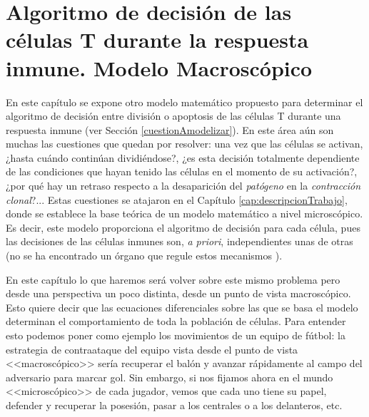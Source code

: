 
\chapter{Algoritmo de decisión de las células T durante la respuesta inmune. Modelo Macroscópico}
\label{cap:modeloMacroscopico}

En este capítulo se expone otro modelo matemático propuesto para determinar el algoritmo de decisión entre división o apoptosis de las células T durante una respuesta inmune (ver Sección \ref{cuestionAmodelizar}). En este área aún son muchas las cuestiones que quedan por resolver: una vez que las células se activan, ¿hasta cuándo continúan dividiéndose?, ¿es esta decisión totalmente dependiente de las condiciones que hayan tenido las células en el momento de su activación?, ¿por qué hay un retraso respecto a la desaparición del \textit{patógeno} en la \textit{contracción clonal}?... Estas cuestiones se atajaron en el Capítulo \ref{cap:descripcionTrabajo}, donde se establece la base teórica de un modelo matemático a nivel microscópico. Es decir, este modelo proporciona el algoritmo de decisión para cada célula, pues las decisiones de las células inmunes son, \textit{a priori}, independientes unas de otras (no se ha encontrado un órgano que regule estos mecanismos \citep{arias2016emergent}).

En este capítulo lo que haremos será volver sobre este mismo problema pero desde una perspectiva un poco distinta, desde un punto de vista macroscópico. Esto quiere decir que las ecuaciones diferenciales sobre las que se basa el modelo determinan el comportamiento de toda la población de células. Para entender esto podemos poner como ejemplo los movimientos de un equipo de fútbol: la estrategia de contraataque del equipo vista desde el punto de vista <<macroscópico>> sería recuperar el balón y avanzar rápidamente al campo del adversario para marcar gol. Sin embargo, si nos fijamos ahora en el mundo <<microscópico>> de cada jugador, vemos que cada uno tiene su papel, defender y recuperar la posesión, pasar a los centrales o a los delanteros, etc.


